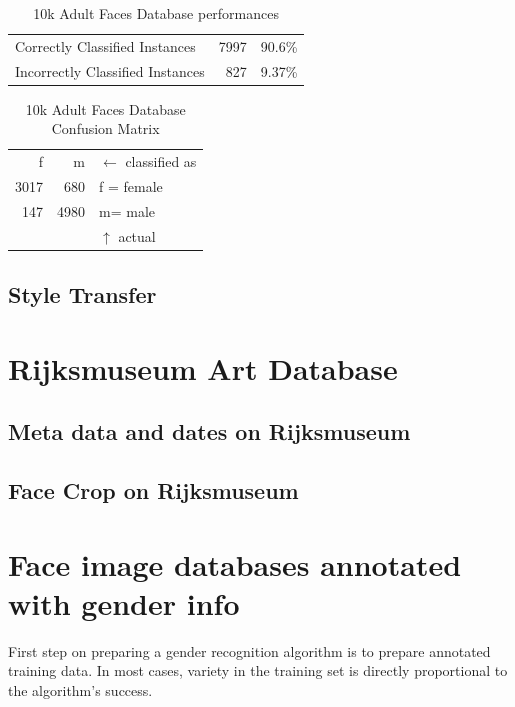 \documentclass[runningheads]{llncs}
\begin{document}
\begin{table}
	\centering
	\caption{10k Adult Faces Database performances}\label{tab:10kadultPerformance}
	\hspace{1cm}
	\begin{tabular}{l|rr}
		Correctly Classified Instances & 7997 & 90.6\%\\
		Incorrectly Classified Instances & 827 & 9.37\%\\
	\end{tabular}
\end{table}

\begin{table}
	\centering
	\caption{10k Adult Faces Database Confusion Matrix}\label{tab:10kadultConfusion}
	\hspace{1cm}
	\begin{tabular}{rrl}
		f & m & $\leftarrow$ classified as\\
		3017 & 680 & f = female \\
		147&4980&m= male\\
		& & $\uparrow$ actual
	\end{tabular}
\end{table}

\subsection{Style Transfer}

\section{Rijksmuseum Art Database}
\subsection{Meta data and dates on Rijksmuseum}

\subsection{Face Crop on Rijksmuseum}

\section{Face image databases annotated with gender info}
First step on preparing a gender recognition algorithm is to prepare annotated training data. In most cases, variety in the training set is directly proportional to the algorithm's success. 
\end{document}
